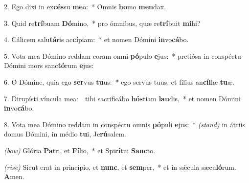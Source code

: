 2. Ego dixi in ex\textbf{cés}su \textbf{me}o:~* Omnis \textbf{ho}mo \textbf{men}dax.

3. Quid re\textbf{trí}buam \textbf{Dó}mino,~* pro ómnibus, quæ re\textbf{trí}buit \textbf{mi}hi?

4. Cálicem salu\textbf{tá}ris ac\textbf{cí}piam:~* et nomen Dómini \textbf{in}vo\textbf{cá}bo.

5. Vota mea Dómino reddam coram omni \textbf{pó}pulo \textbf{e}jus:~* pretiósa in conspéctu Dómini mors sanc\textbf{tó}rum \textbf{e}jus:

6. O Dómine, quia ego \textbf{ser}vus \textbf{tu}us:~* ego servus tuus, et fílius an\textbf{cíl}læ \textbf{tu}æ.

7. Dirupísti víncula mea:~\GreDagger\ tibi sacrificábo \textbf{hós}tiam \textbf{lau}dis,~* et nomen Dómini \textbf{in}vo\textbf{cá}bo.

8. Vota mea Dómino reddam in conspéctu omnis \textbf{pó}puli \textbf{e}jus:~* {\color{red}\textit{(stand)}} in átriis domus Dómini, in médio \textbf{tu}i, Je\textbf{rú}salem.

{\color{red}\textit{(bow)}} Glória \textbf{Pa}tri, et \textbf{Fí}lio,~* et Spi\textbf{rí}tui \textbf{Sanc}to.

{\color{red}\textit{(rise)}} Sicut erat in princípio, et \textbf{nunc}, et \textbf{sem}per,~* et in s\'{\ae}cula sæcu\textbf{ló}rum. \textbf{A}men.